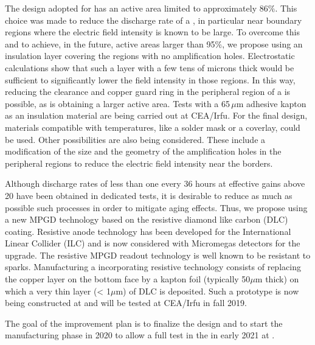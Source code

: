 The  design adopted for  has an active area limited to approximately 86$\%$. This choice was made to reduce the discharge rate of a , in particular near boundary regions where the electric field intensity is known to be large. To overcome this and to achieve, in the future, active areas larger than 95$\%$, we propose using an insulation layer covering the regions with no amplification holes. Electrostatic calculations show that such a layer with a few tens of microns thick would be sufficient to significantly lower the field intensity in those regions. In this way, reducing the \frfour clearance and copper guard ring in the peripheral region of a  is possible, as is obtaining a larger active area. Tests with a 65\,$\mu$m adhesive kapton as an insulation material are being carried out at CEA/Irfu. For the final  design, materials compatible with  temperatures, like a solder mask or a coverlay, could be used. Other possibilities are also being considered. These include a modification of the size and the geometry of the amplification holes in the peripheral regions to reduce the electric field intensity near the  borders.

Although  discharge rates of less than one every \num{36} hours at effective gains above \num{20} have been obtained in dedicated \coldbox tests, it is desirable to reduce as much as possible such processes in order to mitigate aging effects. Thus, we propose using a new MPGD  technology based on the resistive diamond like carbon (DLC) coating. Resistive anode technology has been developed for the International Linear Collider (ILC)  and is now considered with Micromegas detectors for the   upgrade. The resistive MPGD readout technology is well known to be resistant to sparks. Manufacturing a   incorporating resistive technology consists of replacing the copper layer on the bottom face by a kapton foil (typically 50$\mu$m thick) on which a very thin layer (< 1$\mu$m) of DLC is deposited. Such a  prototype is now being constructed at  and will be tested at CEA/Irfu in fall 2019. 

The goal of the  improvement plan is to finalize the  design and to start the manufacturing phase in 2020 to allow a full  test in the \coldbox in early 2021 at .

